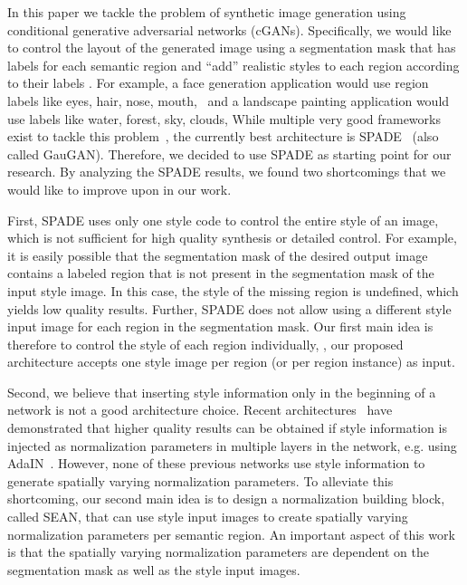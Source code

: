 \documentclass[10pt,twocolumn,letterpaper]{article}
\begin{document}
In this paper we tackle the problem of synthetic image generation using conditional generative adversarial networks (cGANs). Specifically, we would like to control the layout of the generated image using a segmentation mask that has labels for each semantic region and ``add'' realistic styles to each region according to their labels . For example, a face generation application would use region labels like eyes, hair, nose, mouth, \etc~and a landscape painting application would use labels like water, forest, sky, clouds, \etc
While multiple very good frameworks exist to tackle this problem~\cite{isola2016imagetoimage,chen2017photographic,qi2018semiparametric, wang2018pix2pixHD}, the currently best architecture is SPADE~\cite{park2019SPADE} (also called GauGAN). Therefore, we decided to use SPADE as starting point for our research. By analyzing the SPADE results, we found two shortcomings that we would like to improve upon in our work.


First, SPADE uses only one style code to control the entire style of an image, which is not sufficient for high quality synthesis or detailed control.
For example, it is easily possible that the segmentation mask of the desired output image contains a labeled region that is not present in the segmentation mask of the input style image. 
In this case, the style of the missing region is undefined, which yields low quality results.
Further, SPADE does not allow using a different style input image for each region in the segmentation mask. 
Our first main idea is therefore to control the style of each region individually, \ie, our proposed architecture accepts one style image per region (or per region instance) as input.

Second, we believe that inserting style information only in the beginning of a network is not a good architecture choice. Recent architectures~\cite{karras2018stylebased,liu2019fewshot,alharbi2019latent} have demonstrated that higher quality results can be obtained if style information is injected as normalization parameters in multiple layers in the network, e.g. using AdaIN~\cite{huang2017arbitrary}. However, none of these previous networks use style information to generate spatially varying normalization parameters.
To alleviate this shortcoming, our second main idea is to design a normalization building block, called SEAN, that can use style input images to create spatially varying normalization parameters per semantic region. An important aspect of this work is that the spatially varying normalization parameters are dependent on the segmentation mask as well as the style input images.
\end{document}
